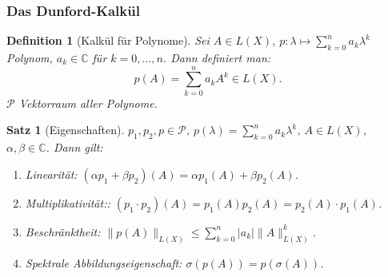 \documentclass[12pt]{extreport} %
\newcommand{\C}{\mathbb{C}}
\theoremstyle{named}
\theoremstyle{nnamed}
\theoremstyle{itshape}
\newtheorem{definition}{Definition}  \counterwithin{definition}{chapter}
\theoremstyle{normal}
\newtheorem*{satz}{Satz}
\begin{document}
\subsubsection*{Das Dunford-Kalkül}

\begin{definition}[Kalkül für Polynome]
	Sei $A \in L(X)$, $p \colon \lambda \mapsto \sum_{k = 0}^{n} a_k \lambda^k$ Polynom, $a_k \in \C$ für $k = 0, \dotsc, n$. Dann definiert man:
	$$ p(A) = \sum_{k = 0}^{n} a_k A^k \in L(X). $$
	$\mathcal{P}$ Vektorraum aller Polynome.	
\end{definition}

\begin{satz}[Eigenschaften]
	$p_1, p_2, p \in \mathcal{P}$, $p(\lambda) = \sum_{k=0}^{n} a_k \lambda^k$, $A \in L(X)$, $\alpha, \beta \in \C$. Dann gilt:
	\begin{enumerate}[label=\upshape(\arabic*\upshape)]
		\item Linearität: $\left( \alpha p_1 + \beta p_2 \right) (A) = \alpha p_1(A) + \beta p_2(A)$.
		\item Multiplikativität:: $\left( p_1 \cdot p_2 \right) (A) = p_1(A) p_2(A) = p_2(A) \cdot p_1(A)$.
		\item Beschränktheit: $\|p(A) \|_{L(X)} \leq \sum_{k=0}^{n} |a_k| \| A \|^k_{L(X)}$.
		\item Spektrale Abbildungseigenschaft: $\sigma \left( p(A) \right) = p \left( \sigma(A) \right)$.
	\end{enumerate}
	

\end{satz}
\end{document}
